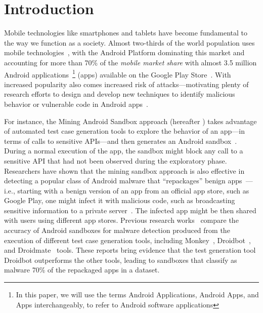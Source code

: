 \section{Introduction}\label{sec:introduction}

Mobile technologies like smartphones and tablets have become fundamental to the way we function as a society. Almost two-thirds of the world population
uses mobile technologies~\cite{Comscore,DBLP:journals/tse/MartinSJZH17}, with the
Android Platform dominating this market and accounting for more than 70\% of the \emph{mobile
market share} with almost 3.5 million Android applications~\footnote{In this paper, we will use the terms Android Applications, Android Apps, and Apps interchangeably, to refer to Android software applications} (apps)
available on the Google Play Store~\cite{Statista}. 
With increased popularity also comes increased risk of attacks---motivating plenty of research efforts to design and develop new techniques
to identify malicious behavior or vulnerable code in Android apps~\cite{10.1145/3017427}.


For instance, the
Mining Android Sandbox approach (hereafter \mas) takes advantage of automated test case generation tools 
to explore the behavior of an app---in terms of calls to sensitive APIs---and then
generates an Android sandbox~\cite{DBLP:conf/icse/JamrozikSZ16}. During a normal
execution of the app, the sandbox might block any call to a sensitive API
that had not been observed during the exploratory phase. 
Researchers have shown that the mining sandbox approach is also effective
in detecting a popular class of Android malware that ``repackages'' benign apps~\cite{DBLP:conf/wcre/BaoLL18,le2018towards}---i.e., starting with a benign
version of an app from an official app store, such as Google Play, one might infect it with
malicious code, such as broadcasting
sensitive information to a private server~\cite{DBLP:journals/tse/LiBK21}. The infected app might be then 
shared with users using different app stores. 
Previous research works~\cite{DBLP:conf/wcre/BaoLL18,DBLP:journals/jss/CostaMMSSBNR22} compare the accuracy of Android sandboxes for malware detection 
produced from the execution of different test case generation tools, including Monkey~\cite{Monkey}, Droidbot~\cite{DBLP:conf/icse/LiYGC17}, and Droidmate~\cite{DBLP:conf/kbse/BorgesHZ18} tools.
These reports bring evidence that the test generation tool Droidbot outperforms the other tools, leading to sandboxes that
classify as malware 70\% of the repackaged apps in a dataset.

